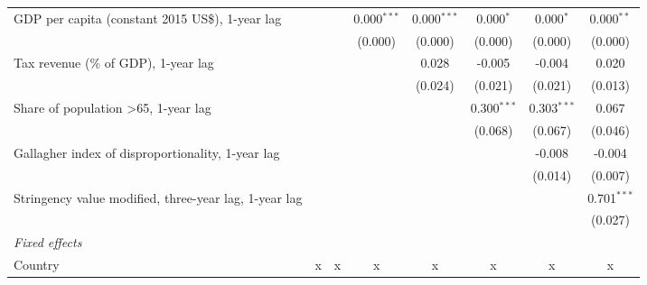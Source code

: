 \begin{tabular}{lccccccc}
   GDP per capita (constant 2015 US\$), 1-year lag                                             &              &              & 0.000$^{***}$ & 0.000$^{***}$ & 0.000$^{*}$    & 0.000$^{*}$    & 0.000$^{**}$\\   
                                                                                               &              &              & (0.000)       & (0.000)       & (0.000)        & (0.000)        & (0.000)\\   
   Tax revenue (\% of GDP), 1-year lag                                                         &              &              &               & 0.028         & -0.005         & -0.004         & 0.020\\   
                                                                                               &              &              &               & (0.024)       & (0.021)        & (0.021)        & (0.013)\\   
   Share of population >65, 1-year lag                                                         &              &              &               &               & 0.300$^{***}$  & 0.303$^{***}$  & 0.067\\   
                                                                                               &              &              &               &               & (0.068)        & (0.067)        & (0.046)\\   
   Gallagher index of disproportionality, 1-year lag                                           &              &              &               &               &                & -0.008         & -0.004\\   
                                                                                               &              &              &               &               &                & (0.014)        & (0.007)\\   
   Stringency value modified, three-year lag, 1-year lag                                       &              &              &               &               &                &                & 0.701$^{***}$\\   
                                                                                               &              &              &               &               &                &                & (0.027)\\   
   \emph{Fixed effects}\\
   Country                                                                                     & x            & x            & x             & x             & x              & x              & x\\  

\end{tabular}
